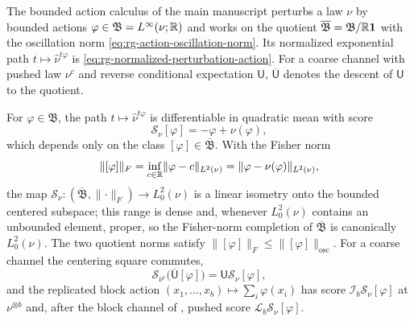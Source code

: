 The bounded action calculus of the main manuscript perturbs a law \(\nu\) by bounded
actions \(\varphi\in\mathfrak B=L^\infty(\nu;\mathbb R)\) and works on the quotient
\(\overline{\mathfrak B}=\mathfrak B/\mathbb R\mathbf 1\) with the oscillation norm
\eqref{eq:rg-action-oscillation-norm}. Its normalized exponential path
\(t\mapsto\widehat\nu^{t\varphi}\) is \eqref{eq:rg-normalized-perturbation-action}. For a
coarse channel with pushed law \(\nu^c\) and reverse conditional expectation \(\mathsf U\),
\(\overline{\mathsf U}\) denotes the descent of \(\mathsf U\) to the quotient.

For \(\varphi\in\mathfrak B\), the path \(t\mapsto\widehat\nu^{t\varphi}\) is
differentiable in quadratic mean with score
\begin{equation}
\mathscr S_\nu[\varphi]=-\varphi+\nu(\varphi),
\label{eq:rg-action-score-map}
\end{equation}
which depends only on the class \([\varphi]\in\overline{\mathfrak B}\). With the Fisher
norm
\begin{equation}
\lVert[\varphi]\rVert_F
=\inf_{c\in\mathbb R}\lVert\varphi-c\rVert_{L^2(\nu)}
=\lVert\varphi-\nu(\varphi)\rVert_{L^2(\nu)},
\label{eq:rg-action-fisher-norm}
\end{equation}
the map \(\mathscr S_\nu:(\overline{\mathfrak B},\lVert\cdot\rVert_F)\to L^2_0(\nu)\) is a
linear isometry onto the bounded centered subspace; this range is dense and, whenever
\(L^2_0(\nu)\) contains an unbounded element, proper, so the Fisher-norm completion of
\(\overline{\mathfrak B}\) is canonically \(L^2_0(\nu)\). The two quotient norms satisfy
\(\lVert[\varphi]\rVert_F\leq\lVert[\varphi]\rVert_{\mathrm{osc}}\). For a coarse channel
the centering square commutes,
\begin{equation}
\mathscr S_{\nu^c}\bigl(\overline{\mathsf U}[\varphi]\bigr)
=\mathsf U\mathscr S_\nu[\varphi],
\label{eq:rg-score-action-square}
\end{equation}
and the replicated block action \((x_1,\dots,x_b)\mapsto\sum_i\varphi(x_i)\) has score
\(\mathscr I_b\mathscr S_\nu[\varphi]\) at \(\nu^{\otimes b}\) and, after the block
channel of , pushed score
\(\mathscr L_b\mathscr S_\nu[\varphi]\). 

